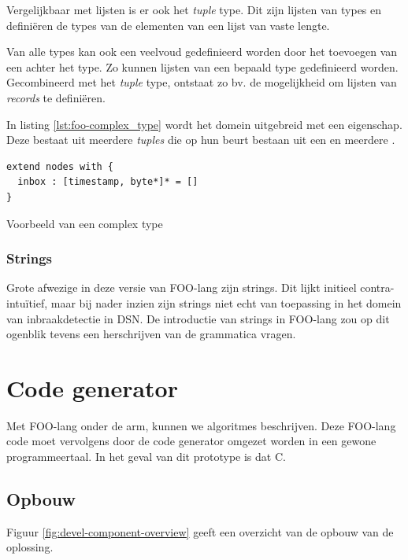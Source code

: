 Vergelijkbaar met lijsten is er ook het \emph{tuple} type. Dit zijn lijsten van
types en defini\"eren de types van de elementen van een lijst van vaste lengte.

Van alle types kan ook een veelvoud gedefinieerd worden door het toevoegen van
een \ttt{*} achter het type. Zo kunnen lijsten van een bepaald type
gedefinieerd worden. Gecombineerd met het \emph{tuple} type, ontstaat zo bv. de
mogelijkheid om lijsten van \emph{records} te defini\"eren.

In listing \ref{lst:foo-complex_type} wordt het  domein uitgebreid
met een  eigenschap. Deze bestaat uit meerdere \emph{tuples} die op
hun beurt bestaan uit een  en meerdere .

\begin{listing}[ht]
  \begin{verbatim}
extend nodes with {
  inbox : [timestamp, byte*]* = []
}
  \end{verbatim}
  \vspace{-5mm}
  \caption{Voorbeeld van een complex type}
  \label{lst:foo-complex_type}
\end{listing}

\subsubsection{Strings}

Grote afwezige in deze versie van FOO-lang zijn strings. Dit lijkt initieel
contra-intu\"itief, maar bij nader inzien zijn strings niet echt van toepassing
in het domein van inbraakdetectie in DSN. De introductie van strings in
FOO-lang zou op dit ogenblik tevens een herschrijven van de grammatica vragen.

\section{Code generator}
\label{section:devel-codegen}

Met FOO-lang onder de arm, kunnen we algoritmes beschrijven. Deze FOO-lang code
moet vervolgens door de code generator omgezet worden in een gewone
programmeertaal. In het geval van dit prototype is dat C.

\subsection{Opbouw}

Figuur \ref{fig:devel-component-overview} geeft een overzicht van de opbouw van
de oplossing.

